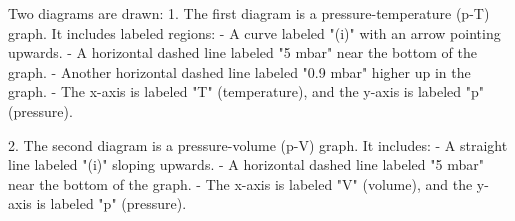 Two diagrams are drawn:  
1. The first diagram is a pressure-temperature (p-T) graph. It includes labeled regions:  
   - A curve labeled "(i)" with an arrow pointing upwards.  
   - A horizontal dashed line labeled "5 mbar" near the bottom of the graph.  
   - Another horizontal dashed line labeled "0.9 mbar" higher up in the graph.  
   - The x-axis is labeled "T" (temperature), and the y-axis is labeled "p" (pressure).  

2. The second diagram is a pressure-volume (p-V) graph. It includes:  
   - A straight line labeled "(i)" sloping upwards.  
   - A horizontal dashed line labeled "5 mbar" near the bottom of the graph.  
   - The x-axis is labeled "V" (volume), and the y-axis is labeled "p" (pressure).